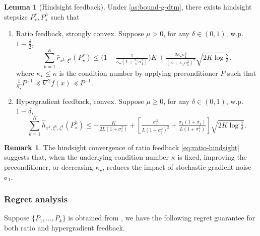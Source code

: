 \documentclass{article}
\theoremstyle{definition}
\newtheorem{lemma}[lemma]{Lemma}
\newtheorem{remark}[remark]{Remark}
\DeclareRobustCommand{\namerefc}[2]{\hyperref[#2]{\textcolor{#1}{\nameref*{#2}}}}
\newcommand{\osgd}{\namerefc{purple}{alg:sosgm}}
\begin{document}
\begin{lemma}[Hindsight feedback]
  \label{lem:hindsight}
  Under \cref{as:bound-g-dtm},
  there exists hindsight stepsize $P_{\star}^r, P^h_{\star}$ such that
  \begin{enumerate}
    \item Ratio feedback, strongly convex. Suppose $\mu > 0$, for any $\delta
    \in (0, 1)$, w.p. $1 - \frac{\delta}{2}$,
    \begin{equation}
      \textstyle \sum_{k = 1}^K \hat{r}_{x^k, \xi^k} (P^r_{\star}) \leq \big( 1 -
      \tfrac{1}{\kappa_{\star} \left( 1 + \frac{\kappa_{\star}}{\kappa}
      \sigma_1^2 \right)} \big) K + \tfrac{2 \kappa_{\star}
      \sigma_1^3}{(\kappa + \kappa_{\star} \sigma_1^2)^2} \sqrt{2 K \log
      \tfrac{2}{\delta}} . \label{eq:ratio-hindsight}
    \end{equation}
    where $\kappa_{\star} \leq \kappa$ is the condition number by applying preconditioner $P$ such that $\tfrac{1}{\kappa_{\star}} P^{- 1}
    \preceq \nabla^2 f (x) \preceq P^{- 1}$.
    
    \item Hypergradient feedback, convex. Suppose $\mu \geq 0$, for any
    $\delta \in (0, 1)$, w.p. $1 - \delta$,
    \begin{equation}
      \textstyle \sum_{k = 1}^K \hat{h}_{x^k, \xi^k, \zeta^k} (P^h_{\star}) \leq -
      \tfrac{K}{2 L (1 + \sigma_1^2)} + \left[ \tfrac{\sigma_1^3}{L (1 +
      \sigma_1^2)^2} + \tfrac{\sigma_1 (1 + \sigma_1)}{L (1 + \sigma_1^2)}
      \right] \sqrt{2 K \log \tfrac{1}{\delta}} . \label{eq:hyper-hindsight}
    \end{equation}
  \end{enumerate}
\end{lemma}

\begin{remark}
  The hindsight convergence of ratio feedback \eqref{eq:ratio-hindsight}
  suggests that, when the underlying condition number $\kappa$ is fixed,
  improving the preconditioner, or decreasing $\kappa_{\star}$, reduces the
  impact of stochastic gradient noise $\sigma_1$.
\end{remark}

\subsubsection{Regret analysis}\label{sec:bs-regret}

Suppose $\{ P_1, \ldots, P_k \}$ is obtained from {\osgd}, we have the
following regret guarantee for both ratio and hypergradient feedback.
\end{document}
